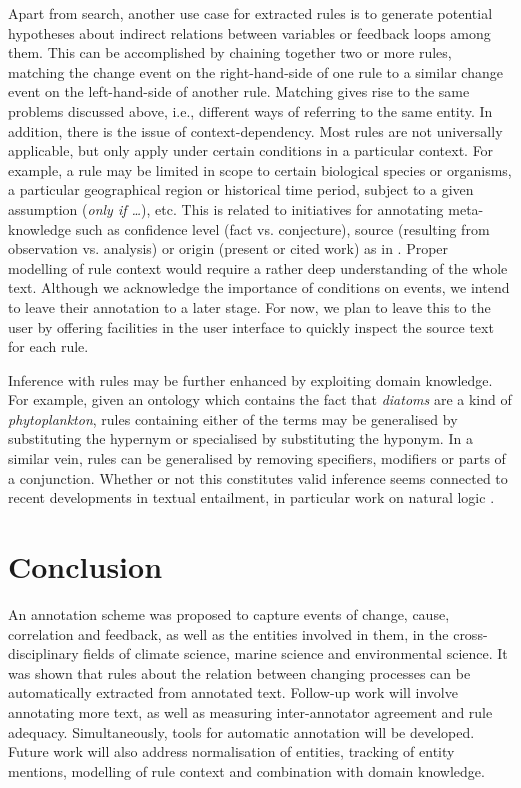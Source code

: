 \documentclass[10pt, a4paper]{article}
\begin{document}
Apart from search, another use case for extracted rules is to generate potential hypotheses about indirect relations between variables or feedback loops among them.
This can be accomplished by chaining together two or more rules, matching the change event on the right-hand-side of one rule to a similar change event on the left-hand-side of another rule.
Matching gives rise to the same problems discussed above, i.e., different ways of referring to the same entity.
In addition, there is the issue of context-dependency.
Most rules are not universally applicable, but only apply under certain conditions in a particular context.
For example, a rule may be limited in scope to certain biological species or organisms, a particular geographical region or historical time period, subject to a given assumption (\emph{only if \ldots}), etc.
This is related to initiatives for annotating meta-knowledge such as confidence level (fact vs. conjecture), source (resulting from observation vs. analysis) or origin (present or cited work) as in  \cite{Thompson2011Enriching}.  
Proper modelling of rule context would require a rather deep understanding of the whole text. 
Although we acknowledge the importance of conditions on events, we intend to leave their annotation to a later stage. 
For now, we plan to leave this to the user by offering facilities in the user interface to quickly inspect the source text for each rule. 

Inference with rules may be further enhanced by exploiting domain knowledge.
For example, given an ontology which contains the fact that \emph{diatoms} are a kind of \emph{phytoplankton}, rules containing either of the terms may be generalised by substituting the hypernym or specialised by substituting the hyponym.
In a similar vein, rules can be generalised by removing specifiers, modifiers or parts of a conjunction.
Whether or not this constitutes valid inference seems connected to recent developments in textual entailment, in particular work on natural logic \cite{MacCartney2008Modeling}.
    

\section{Conclusion}
\label{sec:conclusion}

An annotation scheme was proposed to capture events of change, cause, correlation and feedback, as well as  the entities involved in them, in the cross-disciplinary fields of climate science, marine science and environmental science.
It was shown that rules about the relation between changing processes can be automatically extracted from annotated text.
Follow-up work will involve annotating more text, as well as measuring inter-annotator agreement and rule adequacy.
Simultaneously, tools for automatic annotation will be developed.
Future work will also address normalisation of entities, tracking of entity mentions, modelling of rule context and combination with domain knowledge. 
\end{document}
